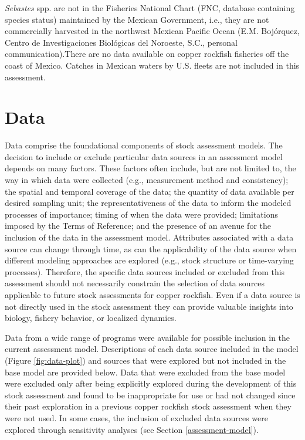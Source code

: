\documentclass[11pt,
  english,
  letterpaper,
]{article}
\begin{document}
\emph{Sebastes} spp. are not in the Fisheries National Chart (FNC, database containing species status) maintained by the Mexican Government, i.e., they are not commercially harvested in the northwest Mexican Pacific Ocean (E.M. Bojórquez, Centro de Investigaciones Biológicas del Noroeste, S.C., personal communication).There are no data available on copper rockfish fisheries off the coast of Mexico. Catches in Mexican waters by U.S. fleets are not included in this assessment.

\hypertarget{data}{%
\section{Data}\label{data}}

Data comprise the foundational components of stock assessment models. The decision to include or exclude particular data sources in an assessment model depends on many factors. These factors often include, but are not limited to, the way in which data were collected (e.g., measurement method and consistency); the spatial and temporal coverage of the data; the quantity of data available per desired sampling unit; the representativeness of the data to inform the modeled processes of importance; timing of when the data were provided; limitations imposed by the Terms of Reference; and the presence of an avenue for the inclusion of the data in the assessment model. Attributes associated with a data source can change through time, as can the applicability of the data source when different modeling approaches are explored (e.g., stock structure or time-varying processes). Therefore, the specific data sources included or excluded from this assessment should not necessarily constrain the selection of data sources applicable to future stock assessments for copper rockfish. Even if a data source is not directly used in the stock assessment they can provide valuable insights into biology, fishery behavior, or localized dynamics.

Data from a wide range of programs were available for possible inclusion in the current assessment model. Descriptions of each data source included in the model (Figure \ref{fig:data-plot}) and sources that were explored but not included in the base model are provided below. Data that were excluded from the base model were excluded only after being explicitly explored during the development of this stock assessment and found to be inappropriate for use or had not changed since their past exploration in a previous copper rockfish stock assessment when they were not used. In some cases, the inclusion of excluded data sources were explored through sensitivity analyses (see Section \ref{assessment-model}).
\end{document}
